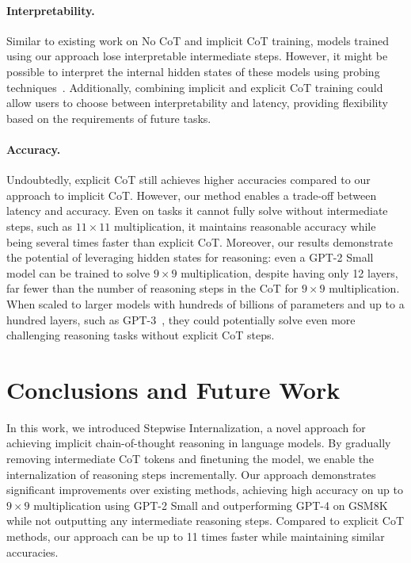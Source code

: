 \documentclass{article}
\begin{document}
\paragraph{Interpretability.}
Similar to existing work on No CoT and implicit CoT training, models trained using our approach lose interpretable intermediate steps. However, it might be possible to interpret the internal hidden states of these models using probing techniques~\citep{belinkov2018internal,hewitt2019designing}. Additionally, combining implicit and explicit CoT training could allow users to choose between interpretability and latency, providing flexibility based on the requirements of future tasks.

\paragraph{Accuracy.}
Undoubtedly, explicit CoT still achieves higher accuracies compared to our approach to implicit CoT. However, our method enables a trade-off between latency and accuracy. Even on tasks it cannot fully solve without intermediate steps, such as $11\times11$ multiplication, it maintains reasonable accuracy while being several times faster than explicit CoT. Moreover, our results demonstrate the potential of leveraging hidden states for reasoning: even a GPT-2 Small model can be trained to solve $9\times9$ multiplication, despite having only 12 layers, far fewer than the number of reasoning steps in the CoT for $9\times9$ multiplication. When scaled to larger models with hundreds of billions of parameters and up to a hundred layers, such as GPT-3~\citep{brown2020language}, they could potentially solve even more challenging reasoning tasks without explicit CoT steps.

\section{Conclusions and Future Work}
In this work, we introduced Stepwise Internalization, a novel approach for achieving implicit chain-of-thought reasoning in language models. By gradually removing intermediate CoT tokens and finetuning the model, we enable the internalization of reasoning steps incrementally. Our approach demonstrates significant improvements over existing methods, achieving high accuracy on up to $9\times9$ multiplication using GPT-2 Small and outperforming GPT-4 on GSM8K while not outputting any intermediate reasoning steps. Compared to explicit CoT methods, our approach can be up to 11 times faster while maintaining similar accuracies.
\end{document}
